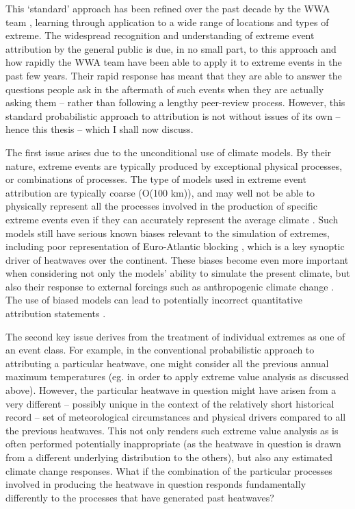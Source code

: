     This `standard' approach has been refined over the past decade by the WWA team \citep{van_oldenborgh_pathways_2021}, learning through application to a wide range of locations and types of extreme. The widespread recognition and understanding of extreme event attribution by the general public is due, in no small part, to this approach and how rapidly the WWA team have been able to apply it to extreme events in the past few years. Their rapid response has meant that they are able to answer the questions people ask in the aftermath of such events when they are actually asking them -- rather than following a lengthy peer-review process. However, this standard probabilistic approach to attribution is not without issues of its own -- hence this thesis -- which I shall now discuss.

    The first issue arises due to the unconditional use of climate models. By their nature, extreme events are typically produced by exceptional physical processes, or combinations of processes. The type of models used in extreme event attribution are typically coarse (O(100 km)), and may well not be able to physically represent all the processes involved in the production of specific extreme events even if they can accurately represent the average climate \citep{sillmann_understanding_2017,trenberth_attribution_2015,demory_role_2014}. Such models still have serious known biases relevant to the simulation of extremes, including poor representation of Euro-Atlantic blocking \citep{schiemann_resolution_2017,dorrington_how_2021}, which is a key synoptic driver of heatwaves over the continent. These biases become even more important when considering not only the models' ability to simulate the present climate, but also their response to external forcings such as anthropogenic climate change \citep{palmer_nonlinear_1999,palmer_simple_2018}. The use of biased models can lead to potentially incorrect quantitative attribution statements \citep{bellprat_attribution_2016,bellprat_towards_2019}. 
    
    The second key issue derives from the treatment of individual extremes as one of an event class. For example, in the conventional probabilistic approach to attributing a particular heatwave, one might consider all the previous annual maximum temperatures (eg. in order to apply extreme value analysis as discussed above). However, the particular heatwave in question might have arisen from a very different -- possibly unique in the context of the relatively short historical record -- set of meteorological circumstances and physical drivers compared to all the previous heatwaves. This not only renders such extreme value analysis as is often performed potentially inappropriate (as the heatwave in question is drawn from a different underlying distribution to the others), but also any estimated climate change responses. What if the combination of the particular processes involved in producing the heatwave in question responds fundamentally differently to the processes that have generated past heatwaves?
    

